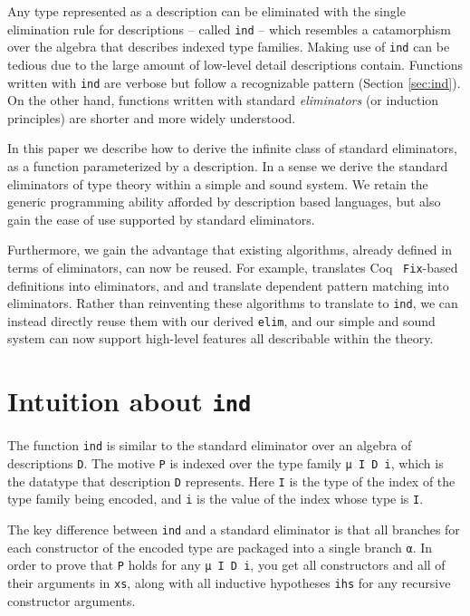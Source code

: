 \documentclass[preprint,nonatbib]{sigplanconf}
\newcommand{\refsec}[1]{Section \ref{sec:#1}}
\begin{document}
Any type represented as a description can
be eliminated with the single elimination rule for descriptions -- called {\tt ind} --
which resembles a catamorphism over the algebra that describes indexed type families.
Making use of {\tt ind} can be tedious due to the large amount of low-level detail
descriptions contain. Functions written with {\tt ind} are
verbose but follow a recognizable pattern (\refsec{ind}). 
On the other hand, functions written with standard {\it eliminators} (or
induction principles) are shorter and more widely understood.

In this paper we describe how to derive the infinite
class of standard eliminators, as a function
parameterized by a description.  In a sense we derive the standard
eliminators of type theory within a simple and sound system.
We retain the generic programming ability afforded by description based languages,
but also gain the ease of use supported by standard eliminators.

Furthermore, we gain the advantage that existing algorithms, already defined in
terms of eliminators, can now be reused.
For example, \citet{gimenez1995codifying} translates
{\sc Coq}~\citeyearpar{coq08} {\tt Fix}-based definitions into eliminators,
and \citet{Goguen06eliminatingdependent} and
\citet{McBride:2000:EM:646540.759262}
translate dependent pattern matching into
eliminators. Rather than reinventing these algorithms to translate to
{\tt ind}, we can instead directly reuse them with our derived {\tt elim},
and our simple and sound system can now support high-level features
all describable within the theory.

\section{Intuition about {\tt ind}}
The function {\tt ind} is similar to the standard
eliminator over an algebra of descriptions {\tt D}. The
motive {\tt P} is indexed over the type family {\tt μ I D i}, which is
the datatype that description {\tt D} represents.
Here {\tt I} is the type of the index of the type family being
encoded, and {\tt i} is the value of the index whose type is {\tt I}.

The key difference
between {\tt ind} and a standard eliminator is that all branches for
each constructor of the encoded type are packaged into a single branch
{\tt α}. In order to prove that {\tt P} holds for any
{\tt μ I D i}, you get all constructors and all of their
arguments in {\tt xs}, along with all inductive
hypotheses {\tt ihs} for any recursive constructor arguments.
\end{document}
